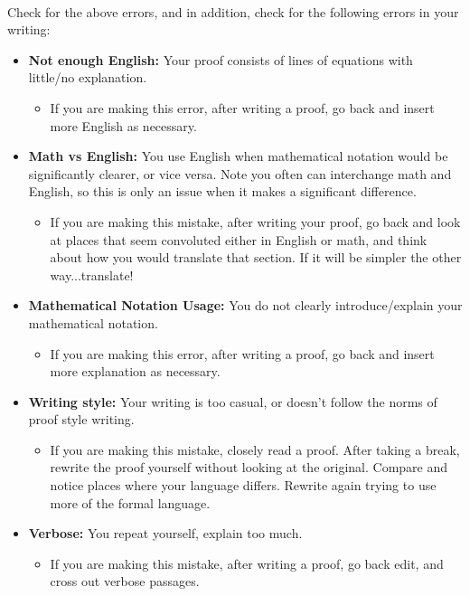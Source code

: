 \documentclass[12pt]{article}
\begin{document}
~\\Check for the above errors, and in addition, check for the following errors in your writing:
\begin{itemize}
\item \textbf{Not enough English:} Your proof consists of lines of equations with little/no explanation.
\begin{itemize}
\item  If you are making this error, after writing a proof, go back and insert more English as necessary.
\end{itemize}

\item \textbf{Math vs English:} You use English when mathematical notation would be significantly clearer, or vice versa. Note you often can interchange math and English, so this is only an issue when it makes a significant difference. 
\begin{itemize}
\item 
If you are making this mistake, after writing your proof, go back and look at places that seem convoluted either in English or math, and think about how you would translate that section. If it will be simpler the other way...translate!
\end{itemize}
\item \textbf{Mathematical Notation Usage:} You do not clearly introduce/explain your mathematical notation.
\begin{itemize}
\item  If you are making this error, after writing a proof, go back and insert more explanation as necessary.
\end{itemize}
\item \textbf{Writing style:} Your writing is too casual, or doesn't follow the norms of proof style writing.
\begin{itemize}
\item  If you are making this mistake, closely read a proof. After taking a break, rewrite the proof yourself without looking at the original. Compare and notice places where your language differs. Rewrite again trying to use more of the formal language.
\end{itemize} 
\item \textbf{Verbose:} You repeat yourself, explain too much.
\begin{itemize}
\item  If you are making this mistake, after writing a proof, go back edit, and cross out verbose passages.
\end{itemize}  
\end{itemize}
\end{document}
